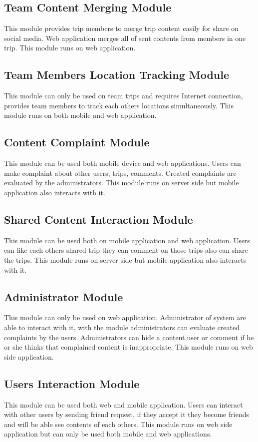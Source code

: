 \subsection{Team Content Merging Module}
This module provides trip members to merge trip content easily for share on social media. Web application merges all of sent contents from members in one trip. This module runs on web application.

\subsection{Team Members Location Tracking Module}
This module can only be used on team trips and requires Internet connection, provides team members to track each others locations simultaneously. This module runs on both mobile  and web application.
   
\subsection{Content Complaint Module}   
This module can be used both mobile device and web applications. Users can make complaint about other users, trips, comments. Created complaints are evaluated by the administrators. This module runs on server side but mobile application also interacts with it.
    
\subsection{Shared Content Interaction Module}    
This module can be used both on mobile application and web application. Users can like each others shared trip they can comment on those trips also can share the trips. This module runs on server side but mobile application also interacts with it.

\subsection{Administrator Module}
This module can only be used on web application. Administrator of system are able to interact with it, with the module administrators can evaluate created complaints by the users. Administrators can hide a content,user or comment if he or she thinks that complained content is inappropriate. This module runs on web side application.

\subsection{Users Interaction Module}
This module can be used both web and mobile application. Users can interact with other users by sending friend request, if they accept it they become friends and will be able see contents of each others. This module runs on web side application but can only be used both mobile and web applications.

